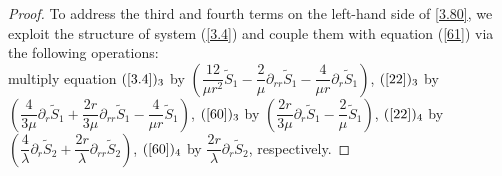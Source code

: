 \documentclass[10pt,reqno]{amsart}
\numberwithin{equation}{section}
\begin{document}
\begin{proof}
		To address the third and fourth terms on the left-hand side of \eqref{3.80}, we exploit the structure of system (\ref{3.4}) and couple them with equation (\ref{61}) via the following operations:\\ 
		multiply equation \((\ref{3.4})_3\) by \((\dfrac{12}{\mu r^2}\tilde{S}_1 - \dfrac{2}{\mu}\partial_{rr}\tilde{S}_1 - \dfrac{4}{\mu r}\partial_{r}\tilde{S}_1)\), 
		\((\ref{22})_3\) by \((\dfrac{4}{3\mu}\partial_{r}\tilde{S}_1 + \dfrac{2r}{3\mu}\partial_{rr}\tilde{S}_1 - \dfrac{4}{\mu r}\tilde{S}_1)\),
		\((\ref{60})_3\) by \((\dfrac{2r}{3\mu}\partial_{r}\tilde{S}_1 - \dfrac{2}{\mu}\tilde{S}_1)\),
		\((\ref{22})_4\) by \((\dfrac{4}{\lambda}\partial_{r}\tilde{S}_2 + \dfrac{2r}{\lambda}\partial_{rr}\tilde{S}_2)\),
		\((\ref{60})_4\) by \(\dfrac{2r}{\lambda}\partial_{r}\tilde{S}_2\), respectively.  
		

\end{proof}
\end{document}
